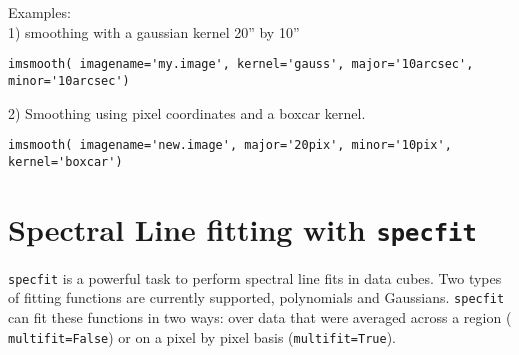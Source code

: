 Examples: \\

1) smoothing with a gaussian kernel 20'' by 10''
\begin{verbatim}
imsmooth( imagename='my.image', kernel='gauss', major='10arcsec', minor='10arcsec')
\end{verbatim}


2) Smoothing using pixel coordinates and a boxcar kernel.
\begin{verbatim}
imsmooth( imagename='new.image', major='20pix', minor='10pix', kernel='boxcar')
\end{verbatim}


\section{Spectral Line fitting with {\tt specfit}}
\label{section:analysis.specfit}

{\tt specfit} is a powerful task to perform spectral line fits in data
cubes. Two types of fitting functions are currently supported,
polynomials and Gaussians. {\tt specfit} can fit these functions in
two ways: over data that were averaged across a region ({\tt
  multifit=False}) or on a pixel
by pixel basis ({\tt multifit=True}). 


